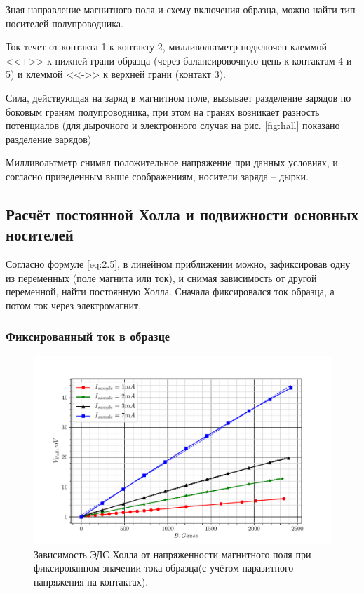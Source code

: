 Зная направление магнитного поля и схему включения образца, можно найти тип носителей полупроводника.

Ток течет от контакта 1 к контакту 2, милливольтметр подключен клеммой <<+>> к нижней грани образца (через балансировочную цепь к контактам 4 и 5) и клеммой
<<->> к верхней грани (контакт 3). 

Сила, действующая на заряд в магнитном поле, вызывает разделение зарядов по боковым граням полупроводника, при этом на
гранях возникает разность потенциалов (для дырочного и электронного случая на рис. \ref{fig:hall} показано разделение
зарядов)

Милливольтметр снимал положительное напряжение при данных условиях, и согласно приведенным выше соображениям, носители заряда -- дырки.

\subsection{Расчёт постоянной Холла и подвижности основных носителей}
Согласно формуле \eqref{eq:2.5}, в линейном приближении можно, зафиксировав одну из переменных (поле магнита или ток), и
снимая зависимость от другой переменной, найти постоянную Холла. Сначала фиксировался ток образца, а потом ток через электромагнит.
\subsubsection*{Фиксированный ток в образце}
\begin{figure}[H]
	\centering
	\includegraphics[width = .98\linewidth]{graphs/cc.pdf}
	\caption{Зависимость ЭДС Холла от напряженности магнитного поля при фиксированном значении тока образца(с учётом паразитного напряжения на контактах).}
	\label{fig:5.5}
\end{figure}

